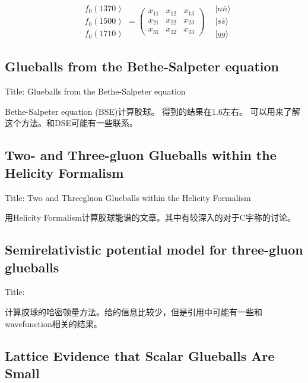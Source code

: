 \documentclass{article}
\begin{document}
$$
\begin{aligned}
& f_0(1370) \\
& f_0(1500) \\
& f_0(1710)
\end{aligned}=\left(\begin{array}{lll}
x_{11} & x_{12} & x_{13} \\
x_{21} & x_{22} & x_{23} \\
x_{31} & x_{32} & x_{33}
\end{array}\right) \begin{aligned}
& |n \bar{n}\rangle \\
& |s \bar{s}\rangle \\
& |g g\rangle
\end{aligned}
$$


\subsection{Glueballs from the Bethe-Salpeter equation}

Title: \quad  Glueballs from the Bethe-Salpeter equation\cite{PhysRevD.92.034001}

Bethe-Salpeter equation (BSE)计算胶球。 得到的结果在1.6左右。 可以用来了解这个方法。和DSE可能有一些联系。


\subsection{Two- and Three-gluon Glueballs within the Helicity Formalism} 

Title: \quad  Two and Threegluon Glueballs within the Helicity Formalism \cite{cvld-kwkd} 

用Helicity Formalism计算胶球能谱的文章。其中有较深入的对于C宇称的讨论。


\subsection{Semirelativistic potential model for three-gluon glueballs}

Title: \cite{Mathieu_2008} 

计算胶球的哈密顿量方法。给的信息比较少，但是引用中可能有一些和wavefunction相关的结果。


\subsection{Lattice Evidence that Scalar Glueballs Are Small}
\end{document}
